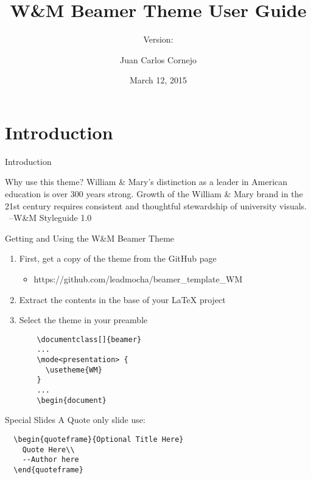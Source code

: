 \documentclass[xcolor=table,compress,pdfpagelabels]{beamer}
\author{Juan Carlos Cornejo}
\title{W\&M Beamer Theme User Guide}
\subtitle{Version: \thisDocumentVersion}
\institute{The College of William \& Mary}
\date{March 12, 2015}
\begin{document}
\begin{frame}[plain]
 \titlepage
\end{frame}


\section{Introduction}
\begin{frame}{Introduction}
\begin{center}
\end{center}
\end{frame}

\begin{quoteframe}{Why use this theme?}
William \& Mary's distinction as a leader in American education is over 300 years strong. Growth of the William \& Mary brand in the 21st century requires consistent and thoughtful stewardship of university visuals.\\
\ \hfill--W\&M Styleguide 1.0
\end{quoteframe}

\begin{frame}[fragile]{Getting and Using the W\&M Beamer Theme}
\begin{enumerate}
  \item First, get a copy of the theme from the GitHub page
  \begin{itemize}
    \item https://github.com/leadmocha/beamer\_template\_WM
  \end{itemize}
  \item Extract the contents in the base of your LaTeX project
  \item Select the theme in your preamble
  \begin{verbatim}
    \documentclass[]{beamer}
    ...
    \mode<presentation> {
      \usetheme{WM}
    }
    ...
    \begin{document}
  \end{verbatim}
\end{enumerate}
\end{frame}

\begin{frame}[fragile]{Special Slides}
 A Quote only slide use:
  \begin{verbatim}
  \begin{quoteframe}{Optional Title Here}
    Quote Here\\
    --Author here
  \end{quoteframe}
  \end{verbatim}
 
\end{frame}
\end{document}
